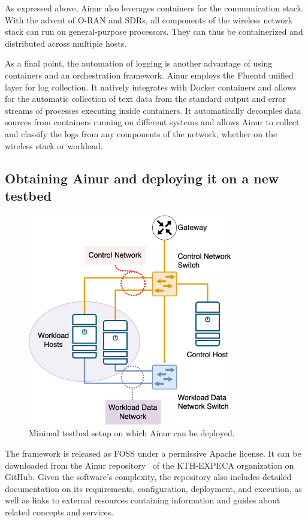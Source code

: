As expressed above, Ainur also leverages containers for the communication stack.
With the advent of \gls{O-RAN} and \glspl{SDR}, all components of the wireless network stack can run on general-purpose processors.
They can thus be containerized and distributed across multiple hosts.

As a final point, the automation of logging is another advantage of using containers and an orchestration framework.
Ainur employs the Fluentd unified layer for log collection.
It natively integrates with Docker containers and allows for the automatic collection of text data from the standard output and error streams of processes executing inside containers.
It automatically decouples data sources from containers running on different systems and allows Ainur to collect and classify the logs from any components of the network, whether on the wireless stack or workload.

\subsection{Obtaining Ainur and deploying it on a new testbed}

\begin{figure}
    \centering
    \includegraphics[height=25em]{publications/2022Ainur/figures/network-minimal}
    \caption{Minimal testbed setup on which Ainur can be deployed.}\label{paper:olguinmunoz2022airnur:fig:network:minimal}
\end{figure}

The framework is released as \gls{FOSS} under a permissive Apache license.
It can be downloaded from the Ainur repository~\cite{ainur:github} of the {KTH-EXPECA} organization on GitHub.
Given the software's complexity, the repository also includes detailed documentation on its requirements, configuration, deployment, and execution, as well as links to external resources containing information and guides about related concepts and services.

